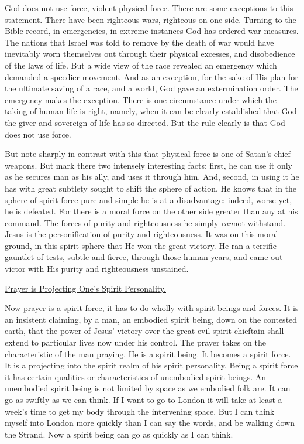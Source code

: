 God does not use force, violent physical force. There are some exceptions
to this statement. There have been righteous wars, righteous on one side.
Turning to the Bible record, in emergencies, in extreme instances God has
ordered war measures. The nations that Israel was told to remove by the
death of war would have inevitably worn themselves out through their
physical excesses, and disobedience of the laws of life. But a wide view
of the race revealed an emergency which demanded a speedier movement. And
as an exception, for the sake of His plan for the ultimate saving of a
race, and a world, God gave an extermination order. The emergency makes
the exception. There is one circumstance under which the taking of human
life is right, namely, when it can be clearly established that God the
giver and sovereign of life has so directed. But the rule clearly is that
God does not use force.

But note sharply in contrast with this that physical force is one of
Satan's chief weapons. But mark there two intensely interesting facts:
first, he can use it only as he secures man as his ally, and uses it
through him. And, second, in using it he has with great subtlety sought to
shift the sphere of action. He knows that in the sphere of spirit force
pure and simple he is at a disadvantage: indeed, worse yet, he is
defeated. For there is a moral force on the other side greater than any at
his command. The forces of purity and righteousness he simply \textit{can}not
withstand. Jesus is the personification of purity and righteousness. It
was on this moral ground, in this spirit sphere that He won the great
victory. He ran a terrific gauntlet of tests, subtle and fierce, through
those human years, and came out victor with His purity and righteousness
unstained.



\underline{Prayer is Projecting One's Spirit Personality.}


Now prayer is a spirit force, it has to do wholly with spirit beings and
forces. It is an insistent claiming, by a man, an embodied spirit being,
down on the contested earth, that the power of Jesus' victory over the
great evil-spirit chieftain shall extend to particular lives now under his
control. The prayer takes on the characteristic of the man praying. He is
a spirit being. It becomes a spirit force. It is a projecting into the
spirit realm of his spirit personality. Being a spirit force it has
certain qualities or characteristics of unembodied spirit beings. An
unembodied spirit being is not limited by space as we embodied folk are.
It can go as swiftly as we can think. If I want to go to London it will
take at least a week's time to get my body through the intervening space.
But I can think myself into London more quickly than I can say the words,
and be walking down the Strand. Now a spirit being can go as quickly as I
can think.

